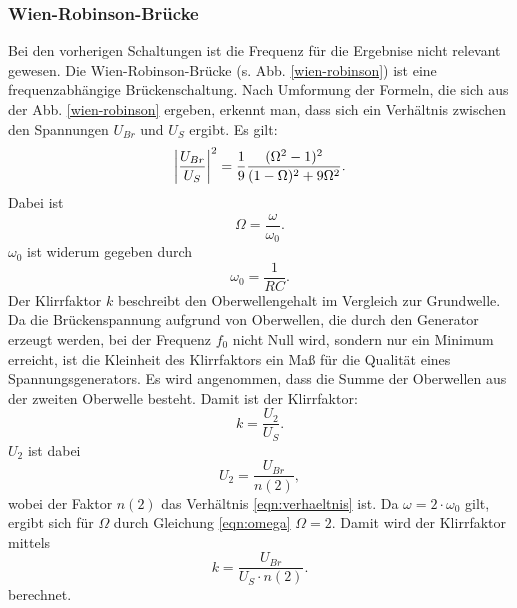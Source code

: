 \subsubsection{Wien-Robinson-Brücke}
Bei den vorherigen Schaltungen ist die Frequenz für die Ergebnise nicht relevant gewesen. %
\newline
Die Wien-Robinson-Brücke (s. Abb. \ref{wien-robinson}) ist eine frequenzabhängige Brückenschaltung.
Nach Umformung der Formeln, die sich aus der Abb. \ref{wien-robinson} ergeben, erkennt man, dass
sich ein Verhältnis zwischen den Spannungen $U_{Br}$ und $U_S$ ergibt. 
Es gilt:
\begin{equation}
\abs{\frac{U_{Br}}{U_S}}^2 = \frac{1}{9} \frac{(\Omega^2 -1)^2}{(1- \Omega)^2 + 9 \Omega^2}.
    \label{eqn:verhaeltnis}
\end{equation}
Dabei ist
\begin{equation}
    \Omega = \frac{\omega}{\omega_0}.
    \label{eqn:omega}
\end{equation}
$\omega_0$ ist widerum gegeben durch
\begin{equation}
    \omega_0 = \frac{1}{RC}.
    \label{omega0}
\end{equation}
\newline
Der Klirrfaktor $k$ beschreibt den Oberwellengehalt im Vergleich zur
Grundwelle. Da die Brückenspannung aufgrund von Oberwellen, die durch
den Generator erzeugt werden, bei der Frequenz $f_0$ nicht Null wird,
sondern nur ein Minimum erreicht, ist die Kleinheit des Klirrfaktors
ein Maß für die Qualität eines Spannungsgenerators.
\newline
Es wird angenommen, dass die Summe der Oberwellen aus der zweiten
Oberwelle besteht. Damit ist der Klirrfaktor:
\begin{equation*}
    k = \frac{U_2}{U_S}.
\end{equation*}
$U_2$ ist dabei
\begin{equation*}
    U_2 = \frac{U_{Br}}{n(2)},
\end{equation*}
wobei der Faktor $n(2)$ das Verhältnis \eqref{eqn:verhaeltnis} ist. %
Da $\omega = 2 \cdot \omega_0$ gilt, ergibt sich für $\Omega$ durch Gleichung \eqref{eqn:omega}
$\Omega = 2$.
Damit wird der Klirrfaktor mittels
\begin{equation}
    k = \frac{U_{Br}}{U_S \cdot n(2)}. %
    \label{eqn:k}
\end{equation}
berechnet.

